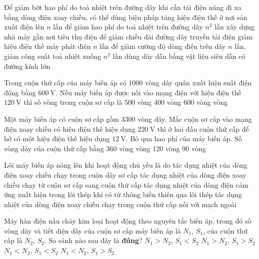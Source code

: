 \begin{ex}
	Để giảm bớt hao phí do toả nhiệt trên đường dây khi cần tải điện năng đi xa bằng dòng điện xoay chiều, có thể dùng biện pháp
	\choice
	{\True tăng hiệu điện thế ở nơi sản xuất điện lên $n$ lần để giảm hao phí do toả nhiệt trên đường dây $n^2$ lần}
	{xây dựng nhà máy gần nơi tiêu thụ điện để giảm chiều dài đường dây truyền tải điện}
	{giảm hiệu điện thế máy phát điện $n$ lần để giảm cường độ dòng điện trên dây $n$ lần, giảm công suất toả nhiệt xuống $n^2$ lần}
	{dùng dây dẫn bằng vật liệu siêu dẫn có đường kính lớn}
	\loigiai{}
\end{ex}
\begin{ex}
	Trong cuộn thứ cấp của máy biến áp có 1000 vòng dây quấn xuất hiện suất điện động bằng $\SI{600}{\volt}$. Nếu máy biến áp được nối vào mạng điện với hiệu điện thế $\SI{120}{\volt}$ thì số vòng trong cuộn sơ cấp là
	\choice
	{500 vòng}
	{400 vòng}
	{600 vòng}
	{ vòng}
\end{ex}
\begin{ex}
	Một máy biến áp có cuộn sơ cấp gồm 3300 vòng dây. Mắc cuộn sơ cấp vào mạng điện xoay chiều có hiệu điện thế hiệu dụng $\SI{220}{\volt}$ thì ở hai đầu cuộn thứ cấp để hở có một hiệu điện thế hiệu dụng $\SI{12}{\volt}$. Bỏ qua hao phí của máy biến áp. Số vòng dây của cuộn thứ cấp bằng
	\choice
	{360 vòng}
	{ vòng}
	{120 vòng}
	{90 vòng}
\end{ex}
\begin{ex}
	Lõi máy biến áp nóng lên khi hoạt động chủ yếu là do
	\choice
	{tác dụng nhiệt của dòng điện xoay chiều chạy trong cuộn dây sơ cấp}
	{tác dụng nhiệt của dòng điện xoay chiều chạy từ cuộn sơ cấp sang cuộn thứ cấp}
	{\True tác dụng nhiệt của dòng điện cảm ứng xuất hiện trong lõi thép khi có từ thông biến thiên qua lõi thép}
	{tác dụng nhiệt của dòng điện xoay chiều chạy trong cuộn thứ cấp nối với mạch ngoài}
	\loigiai{}
\end{ex}
\begin{ex}
	Máy hàn điện nấu chảy kim loại hoạt động theo nguyên tắc biến áp, trong đó số vòng dây và tiết diện dây của cuộn sơ cấp máy biến áp là $N_1$, $S_1$, của cuộn thứ cấp là $N_2$, $S_2$. So sánh nào sau đây là \textbf{đúng}?
	\choice
	{\True $N_1>N_2$, $S_1<S_2$}
	{$N_1>N_2$, $S_1>S_2$}
	{$N_1<N_2$, $S_1<S_2$}
	{$N_1<N_2$, $S_1>S_2$}
\end{ex}
